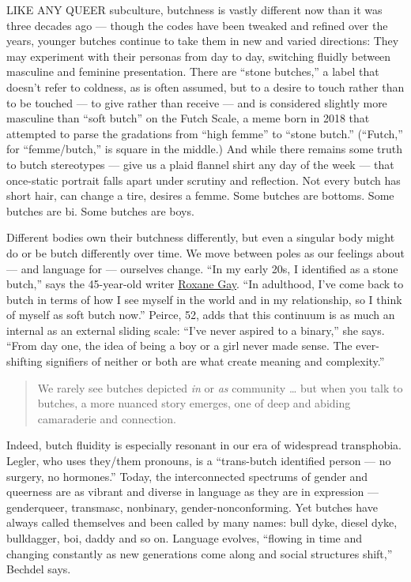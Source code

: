 LIKE ANY QUEER subculture, butchness is vastly different now than it was
three decades ago --- though the codes have been tweaked and refined
over the years, younger butches continue to take them in new and varied
directions: They may experiment with their personas from day to day,
switching fluidly between masculine and feminine presentation. There are
``stone butches,'' a label that doesn't refer to coldness, as is often
assumed, but to a desire to touch rather than to be touched --- to give
rather than receive --- and is considered slightly more masculine than
``soft butch'' on the Futch Scale, a meme born in 2018 that attempted to
parse the gradations from ``high femme'' to ``stone butch.'' (``Futch,''
for ``femme/butch,'' is square in the middle.) And while there remains
some truth to butch stereotypes --- give us a plaid flannel shirt any
day of the week --- that once-static portrait falls apart under scrutiny
and reflection. Not every butch has short hair, can change a tire,
desires a femme. Some butches are bottoms. Some butches are bi. Some
butches are boys.

Different bodies own their butchness differently, but even a singular
body might do or be butch differently over time. We move between poles
as our feelings about --- and language for --- ourselves change. ``In my
early 20s, I identified as a stone butch,'' says the 45-year-old writer
\href{https://www.nytimes.com/column/roxane-gay}{Roxane Gay}. ``In
adulthood, I've come back to butch in terms of how I see myself in the
world and in my relationship, so I think of myself as soft butch now.''
Peirce, 52, adds that this continuum is as much an internal as an
external sliding scale: ``I've never aspired to a binary,'' she says.
``From day one, the idea of being a boy or a girl never made sense. The
ever-shifting signifiers of neither or both are what create meaning and
complexity.''

\begin{quote}
We rarely see butches depicted \emph{in} or \emph{as} community \ldots{}
but when you talk to butches, a more nuanced story emerges, one of deep
and abiding camaraderie and connection.
\end{quote}

Indeed, butch fluidity is especially resonant in our era of widespread
transphobia. Legler, who uses they/them pronouns, is a ``trans-butch
identified person --- no surgery, no hormones.'' Today, the
interconnected spectrums of gender and queerness are as vibrant and
diverse in language as they are in expression --- genderqueer,
transmasc, nonbinary, gender-nonconforming. Yet butches have always
called themselves and been called by many names: bull dyke, diesel dyke,
bulldagger, boi, daddy and so on. Language evolves, ``flowing in time
and changing constantly as new generations come along and social
structures shift,'' Bechdel says.

